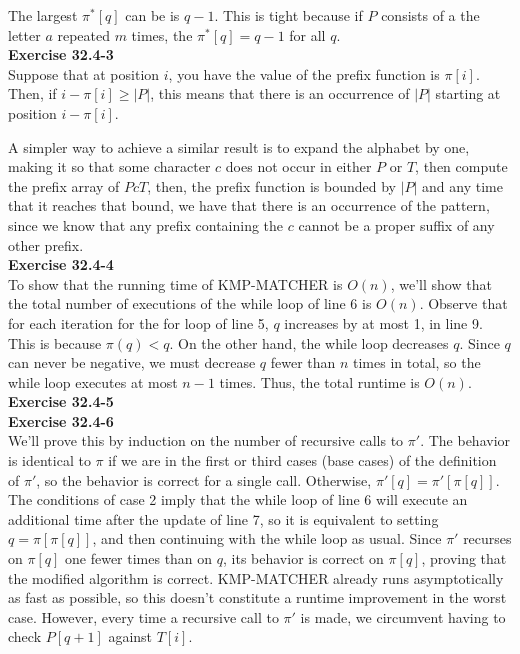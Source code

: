 \documentclass{article}
\begin{document}
The largest $\pi^*[q]$ can be is $q-1$.  This is tight because if $P$ consists of a the letter $a$ repeated $m$ times, the $\pi^*[q] = q-1$ for all $q$. \\



\noindent\textbf{Exercise 32.4-3}\\

Suppose that at position $i$, you have the value of the prefix function is $\pi[i]$. Then, if $i-\pi[i] \ge|P| $, this means that there is an occurrence of $|P|$ starting at position $i-\pi[i]$. 

A simpler way to achieve a similar result is to expand the alphabet by one, making it so that some character $c$ does not occur in either $P$ or $T$, then compute the prefix array of $PcT$, then, the prefix function is bounded by $|P|$ and any time that it reaches that bound, we have that there is an occurrence of the pattern, since we know that any prefix containing the $c$ cannot be a proper suffix of any other prefix.\\

\noindent\textbf{Exercise 32.4-4}\\

To show that the running time of KMP-MATCHER is $O(n)$, we'll show that the total number of executions of the while loop of line 6 is $O(n)$.  Observe that for each iteration for the for loop of line 5, $q$ increases by at most 1, in line 9.  This is because $\pi(q) < q$.  On the other hand, the while loop decreases $q$.  Since $q$ can never be negative, we must decrease $q$ fewer than $n$ times in total, so the while loop executes at most $n-1$ times.  Thus, the total runtime is $O(n)$. \\

\noindent\textbf{Exercise 32.4-5}\\


\noindent\textbf{Exercise 32.4-6}\\

We'll prove this by induction on the number of recursive calls to $\pi'$.  The behavior is identical to $\pi$ if we are in the first or third cases (base cases) of the definition of $\pi'$, so the behavior is correct for a single call. Otherwise, $\pi'[q] = \pi'[\pi[q]]$.  The conditions of case 2 imply that the while loop of line 6 will execute an additional time after the update of line 7, so it is equivalent to setting $q = \pi[\pi[q]]$, and then continuing with the while loop as usual.  Since $\pi'$ recurses on $\pi[q]$ one fewer times than on $q$, its behavior is correct on $\pi[q]$, proving that the modified algorithm is correct.   KMP-MATCHER already runs asymptotically as fast as possible, so this doesn't constitute a runtime improvement in the worst case.  However, every time a recursive call to $\pi'$ is made, we circumvent having to check $P[q+1]$ against $T[i]$.\\
\end{document}
